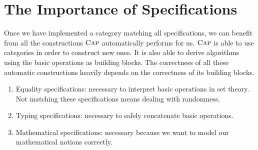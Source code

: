 \section{The Importance of Specifications}

Once we have implemented a category matching all specifications, we can benefit
from all the constructions $\textsc{Cap}$ automatically performs for us. 
$\textsc{Cap}$ is able to use categories in order to construct new ones. It is also
able to derive algorithms using the basic operations as building blocks.
The correctness of all these automatic constructions heavily depends on 
the correctness of its building blocks.
\begin{enumerate}
 \item Equality specifications: necessary to interpret basic operations in set theory.
 Not matching these specifications means dealing with randomness. 
 \item Typing specifications: necessary to safely concatenate basic operations.
 \item Mathematical specifications: necessary because we want to model our mathematical
 notions correctly.
\end{enumerate}


